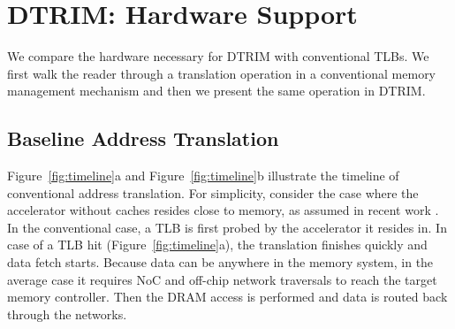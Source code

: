 


\section{DTRIM: Hardware Support}
\label{sec:associativity}

%


We compare the hardware necessary for DTRIM with conventional
TLBs. We first walk the reader through a translation operation in a
conventional memory management mechanism and then we present the same
operation in DTRIM.

\subsection{Baseline Address Translation}

Figure~\ref{fig:timeline}a and Figure~\ref{fig:timeline}b illustrate the timeline of
conventional address translation. For simplicity, consider the case 
where the accelerator without caches resides close to memory, as
assumed in recent work \cite{haria:devirtualizing, picorel:near-memory}. In the conventional case, a TLB is
first probed by the accelerator it resides in. In case of a TLB hit (Figure~\ref{fig:timeline}a), the translation finishes quickly and 
data fetch starts. Because data can be anywhere in the memory system, in the average case it requires NoC and off-chip network 
traversals to reach the target memory controller. Then the DRAM access is performed and data is routed back through the networks.

